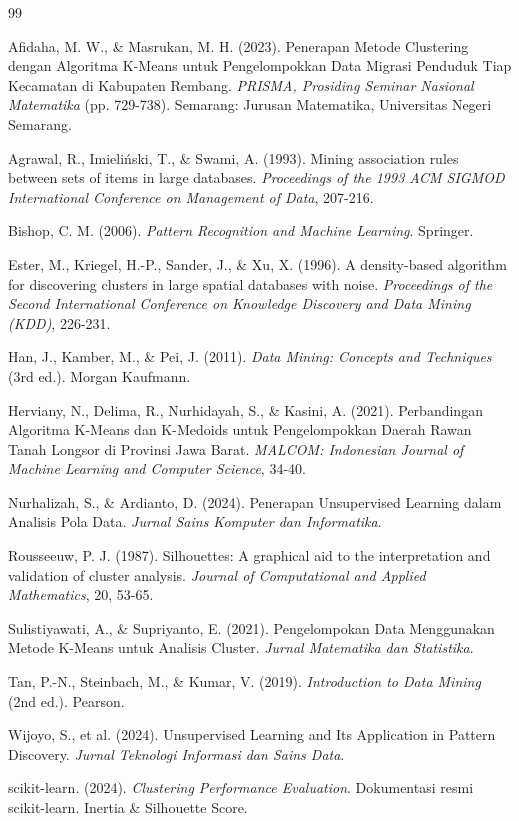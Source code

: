 \documentclass[a4paper,oneside,12pt]{report}
\begin{document}
\begin{thebibliography}{99}

Afidaha, M. W., \& Masrukan, M. H. (2023). Penerapan Metode Clustering dengan Algoritma K-Means untuk Pengelompokkan Data Migrasi Penduduk Tiap Kecamatan di Kabupaten Rembang. \textit{PRISMA, Prosiding Seminar Nasional Matematika} (pp. 729-738). Semarang: Jurusan Matematika, Universitas Negeri Semarang.

Agrawal, R., Imieliński, T., \& Swami, A. (1993). Mining association rules between sets of items in large databases. \textit{Proceedings of the 1993 ACM SIGMOD International Conference on Management of Data}, 207-216.

Bishop, C. M. (2006). \textit{Pattern Recognition and Machine Learning}. Springer.

Ester, M., Kriegel, H.-P., Sander, J., \& Xu, X. (1996). A density-based algorithm for discovering clusters in large spatial databases with noise. \textit{Proceedings of the Second International Conference on Knowledge Discovery and Data Mining (KDD)}, 226-231.

Han, J., Kamber, M., \& Pei, J. (2011). \textit{Data Mining: Concepts and Techniques} (3rd ed.). Morgan Kaufmann.

Herviany, N., Delima, R., Nurhidayah, S., \& Kasini, A. (2021). Perbandingan Algoritma K-Means dan K-Medoids untuk Pengelompokkan Daerah Rawan Tanah Longsor di Provinsi Jawa Barat. \textit{MALCOM: Indonesian Journal of Machine Learning and Computer Science}, 34-40.

Nurhalizah, S., \& Ardianto, D. (2024). Penerapan Unsupervised Learning dalam Analisis Pola Data. \textit{Jurnal Sains Komputer dan Informatika}.

Rousseeuw, P. J. (1987). Silhouettes: A graphical aid to the interpretation and validation of cluster analysis. \textit{Journal of Computational and Applied Mathematics}, 20, 53-65.

Sulistiyawati, A., \& Supriyanto, E. (2021). Pengelompokan Data Menggunakan Metode K-Means untuk Analisis Cluster. \textit{Jurnal Matematika dan Statistika}.

Tan, P.-N., Steinbach, M., \& Kumar, V. (2019). \textit{Introduction to Data Mining} (2nd ed.). Pearson.

Wijoyo, S., et al. (2024). Unsupervised Learning and Its Application in Pattern Discovery. \textit{Jurnal Teknologi Informasi dan Sains Data}.

scikit-learn. (2024). \textit{Clustering Performance Evaluation}. Dokumentasi resmi scikit-learn. Inertia \& Silhouette Score.

\end{thebibliography}
\end{document}
